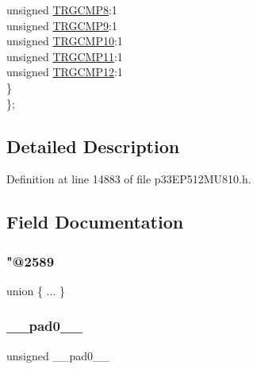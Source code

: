 \begin{DoxyCompactItemize}
\begin{tabbing}
\>\>unsigned \hyperlink{structtag_t_r_i_g4_b_i_t_s_a7d4f3ec40334f00592eb7247457e2fd6}{TRGCMP8}:1\\
\>\>unsigned \hyperlink{structtag_t_r_i_g4_b_i_t_s_a0001e7efb9031bef24e7a19100d11b0b}{TRGCMP9}:1\\
\>\>unsigned \hyperlink{structtag_t_r_i_g4_b_i_t_s_a768e63198a56962df16bcaaf9084f379}{TRGCMP10}:1\\
\>\>unsigned \hyperlink{structtag_t_r_i_g4_b_i_t_s_a8a82ad80802491f065113055f2a059e2}{TRGCMP11}:1\\
\>\>unsigned \hyperlink{structtag_t_r_i_g4_b_i_t_s_a2bc8969a57c3dbec6828f3bda9ebc1fd}{TRGCMP12}:1\\
\>\} \\
\}; \\

\end{tabbing}\end{DoxyCompactItemize}


\subsection{Detailed Description}


Definition at line 14883 of file p33\+E\+P512\+M\+U810.\+h.



\subsection{Field Documentation}
\mbox{\label{structtag_t_r_i_g4_b_i_t_s_a4c84e10a2aa4420479a84aad288a027c}} 
\subsubsection{\texorpdfstring{"@2589}{@2589}}
{\footnotesize\ttfamily union \{ ... \} }

\mbox{\label{structtag_t_r_i_g4_b_i_t_s_adf71f3d8410c1f1dbbc96680a92c49af}} 
\subsubsection{\texorpdfstring{\+\_\+\+\_\+pad0\+\_\+\+\_\+}{\_\_pad0\_\_}}
{\footnotesize\ttfamily unsigned \+\_\+\+\_\+pad0\+\_\+\+\_\+}



